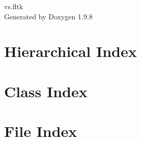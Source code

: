 \documentclass[twoside]{book}
\newcommand{\+}{\discretionary{\mbox{\scriptsize$\hookleftarrow$}}{}{}}
\newcommand{\clearemptydoublepage}{%
    \newpage{\pagestyle{empty}\cleardoublepage}%
  }
\begin{document}
  \raggedbottom
    \hypersetup{pageanchor=false,
                bookmarksnumbered=true,
                pdfencoding=unicode
               }
  \begin{titlepage}
  \vspace*{7cm}
  \begin{center}%
  {\Large vs.\+fltk}\\
  \vspace*{1cm}
  {\large Generated by Doxygen 1.9.8}\\
  \end{center}
  \end{titlepage}
  \clearemptydoublepage
  \tableofcontents
  \clearemptydoublepage
  \hypersetup{pageanchor=true}





\chapter{Hierarchical Index}

\chapter{Class Index}

\chapter{File Index}

\end{document}
